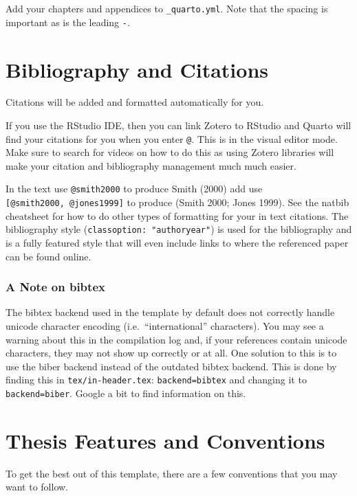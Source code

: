 \documentclass[
  letterpaper,
  11pt,
  english,
  singlespacing,
  headsepline]{MastersDoctoralThesis}
\begin{document}
Add your chapters and appendices to \texttt{\_quarto.yml}. Note that the
spacing is important as is the leading \texttt{-}.

\section{Bibliography and Citations}\label{bibliography-and-citations}

Citations will be added and formatted automatically for you.

If you use the RStudio IDE, then you can link Zotero to RStudio and
Quarto will find your citations for you when you enter \texttt{@}. This
is in the visual editor mode. Make sure to search for videos on how to
do this as using Zotero libraries will make your citation and
bibliography management much much easier.

In the text use \texttt{@smith2000} to produce Smith (2000) add use
\texttt{{[}@smith2000,\ @jones1999{]}} to produce (Smith 2000; Jones
1999). See the natbib cheatsheet for how to do other types of formatting
for your in text citations. The bibliography style
(\texttt{classoption:\ "authoryear"}) is used for the bibliography and
is a fully featured style that will even include links to where the
referenced paper can be found online.

\subsubsection{A Note on bibtex}\label{a-note-on-bibtex}

The bibtex backend used in the template by default does not correctly
handle unicode character encoding (i.e.~``international'' characters).
You may see a warning about this in the compilation log and, if your
references contain unicode characters, they may not show up correctly or
at all. One solution to this is to use the biber backend instead of the
outdated bibtex backend. This is done by finding this in
\texttt{tex/in-header.tex}: \texttt{backend=bibtex} and changing it to
\texttt{backend=biber}. Google a bit to find information on this.

\section{Thesis Features and Conventions}\label{sec-ThesisConventions}

To get the best out of this template, there are a few conventions that
you may want to follow.
\end{document}
